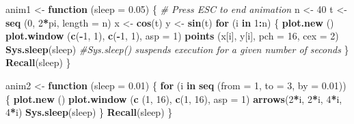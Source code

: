 \documentclass[
]{book}
\newenvironment{Shaded}{\begin{snugshade}}{\end{snugshade}}
\newcommand{\AttributeTok}[1]{\textcolor[rgb]{0.13,0.29,0.53}{#1}}
\newcommand{\CommentTok}[1]{\textcolor[rgb]{0.56,0.35,0.01}{\textit{#1}}}
\newcommand{\ControlFlowTok}[1]{\textcolor[rgb]{0.13,0.29,0.53}{\textbf{#1}}}
\newcommand{\DecValTok}[1]{\textcolor[rgb]{0.00,0.00,0.81}{#1}}
\newcommand{\FloatTok}[1]{\textcolor[rgb]{0.00,0.00,0.81}{#1}}
\newcommand{\FunctionTok}[1]{\textcolor[rgb]{0.13,0.29,0.53}{\textbf{#1}}}
\newcommand{\NormalTok}[1]{#1}
\newcommand{\OtherTok}[1]{\textcolor[rgb]{0.56,0.35,0.01}{#1}}
\newcommand{\SpecialCharTok}[1]{\textcolor[rgb]{0.81,0.36,0.00}{\textbf{#1}}}
\begin{document}
\begin{Shaded}
\begin{Highlighting}[]
\NormalTok{anim1 }\OtherTok{\textless{}{-}} \ControlFlowTok{function}\NormalTok{ (}\AttributeTok{sleep =} \FloatTok{0.05}\NormalTok{) }
\NormalTok{ \{ }\CommentTok{\# Press ESC to end animation}
\NormalTok{   n }\OtherTok{\textless{}{-}} \DecValTok{40}
\NormalTok{   t }\OtherTok{\textless{}{-}} \FunctionTok{seq}\NormalTok{ (}\DecValTok{0}\NormalTok{, }\DecValTok{2}\SpecialCharTok{*}\NormalTok{pi, }\AttributeTok{length =}\NormalTok{ n)}
\NormalTok{   x }\OtherTok{\textless{}{-}} \FunctionTok{cos}\NormalTok{(t)}
\NormalTok{   y }\OtherTok{\textless{}{-}} \FunctionTok{sin}\NormalTok{(t)}
   \ControlFlowTok{for}\NormalTok{ (i }\ControlFlowTok{in} \DecValTok{1}\SpecialCharTok{:}\NormalTok{n)}
\NormalTok{   \{  }\FunctionTok{plot.new}\NormalTok{ ()}
      \FunctionTok{plot.window}\NormalTok{ (}\FunctionTok{c}\NormalTok{(}\SpecialCharTok{{-}}\DecValTok{1}\NormalTok{, }\DecValTok{1}\NormalTok{), }\FunctionTok{c}\NormalTok{(}\SpecialCharTok{{-}}\DecValTok{1}\NormalTok{, }\DecValTok{1}\NormalTok{), }\AttributeTok{asp =} \DecValTok{1}\NormalTok{)}
      \FunctionTok{points}\NormalTok{ (x[i], y[i], }\AttributeTok{pch =} \DecValTok{16}\NormalTok{, }\AttributeTok{cex =} \DecValTok{2}\NormalTok{)}
      \FunctionTok{Sys.sleep}\NormalTok{(sleep) }
      \CommentTok{\#Sys.sleep() suspends execution for a given number of seconds}
\NormalTok{    \}}
   \FunctionTok{Recall}\NormalTok{(sleep) }
\NormalTok{ \}}

\NormalTok{anim2 }\OtherTok{\textless{}{-}} \ControlFlowTok{function}\NormalTok{ (}\AttributeTok{sleep =} \FloatTok{0.01}\NormalTok{) }
\NormalTok{\{ }\ControlFlowTok{for}\NormalTok{ (i }\ControlFlowTok{in} \FunctionTok{seq}\NormalTok{ (}\AttributeTok{from =} \DecValTok{1}\NormalTok{, }\AttributeTok{to =} \DecValTok{3}\NormalTok{, }\AttributeTok{by =} \FloatTok{0.01}\NormalTok{))}
\NormalTok{  \{  }\FunctionTok{plot.new}\NormalTok{ ()}
     \FunctionTok{plot.window}\NormalTok{ (}\FunctionTok{c}\NormalTok{ (}\DecValTok{1}\NormalTok{, }\DecValTok{16}\NormalTok{), }\FunctionTok{c}\NormalTok{(}\DecValTok{1}\NormalTok{, }\DecValTok{16}\NormalTok{), }\AttributeTok{asp =} \DecValTok{1}\NormalTok{)}
     \FunctionTok{arrows}\NormalTok{(}\DecValTok{2}\SpecialCharTok{*}\NormalTok{i, }\DecValTok{2}\SpecialCharTok{*}\NormalTok{i, }\DecValTok{4}\SpecialCharTok{*}\NormalTok{i, }\DecValTok{4}\SpecialCharTok{*}\NormalTok{i)}
     \FunctionTok{Sys.sleep}\NormalTok{(sleep)}
\NormalTok{  \}}
  \FunctionTok{Recall}\NormalTok{(sleep)}
\NormalTok{\}}
\end{Highlighting}
\end{Shaded}
\end{document}
